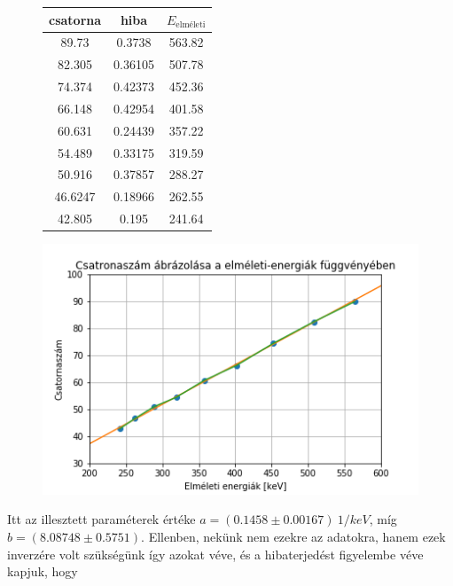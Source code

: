 \documentclass[a4paper,12pt]{article}
\begin{document}
\begin{figure}[!htb]
    \begin{minipage}{.39\textwidth}
    \begin{center}
	\begin{tabular}{|c|c|c|}
		\hline
		csatorna & hiba & $E_{\text{elméleti}}$ \\
		\hline
		89.73 & 0.3738 & 563.82 \\
		\hline
		82.305 & 0.36105 & 507.78 \\
		\hline
		74.374 & 0.42373 & 452.36 \\
		\hline
		66.148 & 0.42954 & 401.58 \\
		\hline
		60.631 & 0.24439 & 357.22 \\
		\hline
		54.489 & 0.33175 & 319.59 \\
		\hline
		50.916 & 0.37857 & 288.27 \\
		\hline
		46.6247 & 0.18966 & 262.55 \\
		\hline
		42.805 & 0.195 & 241.64 \\
		\hline
	\end{tabular}
	\end{center}
	\end{minipage}
    \begin{minipage}{.69\textwidth}
        \centering
        \includegraphics[width=1.\linewidth]{../notebook/Kalib.png}
    \end{minipage}
\end{figure}

\par Itt az illesztett paraméterek értéke $a = (0.1458 \pm 0.00167) ~{1/keV}$, míg $b = (8.08748 \pm 0.5751)$. Ellenben, nekünk nem ezekre az adatokra, hanem ezek inverzére volt szükségünk így azokat véve, és a hibaterjedést figyelembe véve kapjuk, hogy
\end{document}
